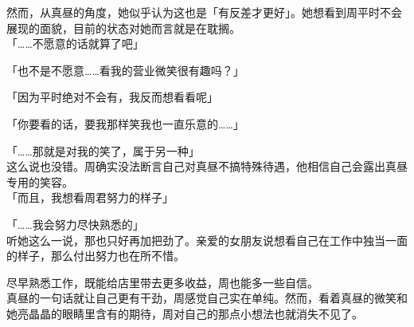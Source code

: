 然而，从真昼的角度，她似乎认为这也是「有反差才更好」。她想看到周平时不会展现的面貌，目前的状态对她而言就是在耽搁。\\

「……不愿意的话就算了吧」

「也不是不愿意……看我的营业微笑很有趣吗？」

「因为平时绝对不会有，我反而想看看呢」

「你要看的话，要我那样笑我也一直乐意的……」

「……那就是对我的笑了，属于另一种」\\

这么说也没错。周确实没法断言自己对真昼不搞特殊待遇，他相信自己会露出真昼专用的笑容。\\

「而且，我想看周君努力的样子」

「……我会努力尽快熟悉的」\\

听她这么一说，那也只好再加把劲了。亲爱的女朋友说想看自己在工作中独当一面的样子，那么付出努力也在所不惜。

尽早熟悉工作，既能给店里带去更多收益，周也能多一些自信。\\

真昼的一句话就让自己更有干劲，周感觉自己实在单纯。然而，看着真昼的微笑和她亮晶晶的眼睛里含有的期待，周对自己的那点小想法也就消失不见了。
